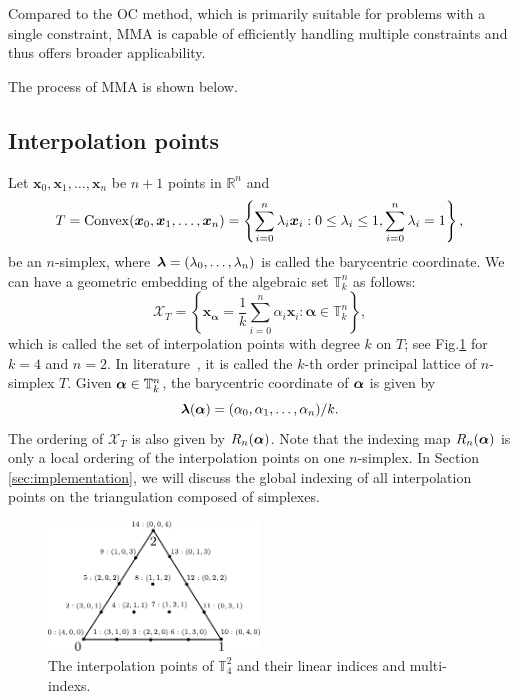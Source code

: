\documentclass[mathpazo]{cicp}
\begin{document}
Compared to the OC method, which is primarily suitable for problems with a single constraint, MMA is capable of efficiently handling multiple constraints and thus offers broader applicability.

The process of MMA is shown below.
 
\subsection{Interpolation points}
Let $\boldsymbol x_0, \boldsymbol x_1, \ldots, \boldsymbol x_n$ be $n+1$ points in $\mathbb R^n$ and 
$$T = {\rm Convex}(\boldsymbol x_0, \boldsymbol x_1, \ldots, \boldsymbol x_n) =\left \{ \sum_{i=0}^n \lambda_i \boldsymbol x_i : 0\leq \lambda_i \leq 1, \sum_{i=0}^n\lambda_i = 1 \right \},$$ 
be an $n$-simplex, where $\boldsymbol \lambda=(\lambda_0, \ldots, \lambda_n)$ is called the barycentric coordinate. We can have a geometric embedding of the algebraic set $\mathbb T^n_k$ as follows:
$$
\mathcal X_{T} = \left \{\boldsymbol
x_{\boldsymbol \alpha} = \frac{1}{k}\sum_{i = 0}^n \alpha_i \boldsymbol
x_i: \boldsymbol \alpha\in \mathbb T^n_k \right \},
$$
which is called the set of interpolation points with degree $k$ on $T$; see Fig.\ref{fig:interpointk4} for $k=4$ and $n=2$. In literature~\cite{nicolaides1972class}, it is called the $k$-th order principal lattice of $n$-simplex $T$. Given $\boldsymbol \alpha\in \mathbb T^{n}_k$, the barycentric coordinate of $\boldsymbol \alpha$ is given by
$$
\boldsymbol \lambda(\boldsymbol \alpha) = (\alpha_0, \alpha_1, \ldots, \alpha_n )/k.
$$ The ordering of $\mathcal X_T$ is also given by $R_n(\boldsymbol\alpha)$.  Note
that the indexing map $R_n(\boldsymbol\alpha)$ is only a local ordering of the
interpolation points on one $n$-simplex. In Section \ref{sec:implementation}, we will discuss the global
indexing of all interpolation points on the triangulation composed of simplexes.


\begin{figure}[htp]
\centering
\includegraphics[width=0.5\textwidth]{figures/tridof-4.pdf}
\caption{The interpolation points of $\mathbb T^2_4$ and their
linear indices and multi-indexs. }
\label{fig:interpointk4}
\end{figure}
\end{document}
